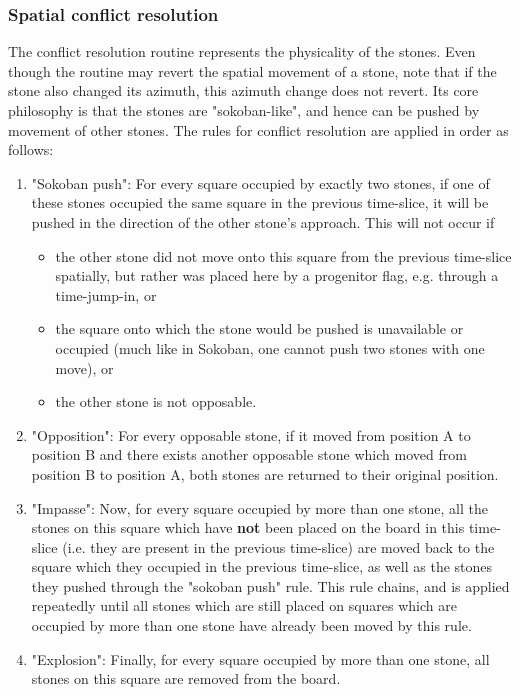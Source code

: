 \documentclass[12pt]{article}
\begin{document}
	\subsubsection{Spatial conflict resolution}\label{sec:spatial conflict resolution}
	The conflict resolution routine represents the physicality of the stones. Even though the routine may revert the spatial movement of a stone, note that if the stone also changed its azimuth, this azimuth change does not revert. Its core philosophy is that the stones are "sokoban-like", and hence can be pushed by movement of other stones. The rules for conflict resolution are applied in order as follows:
	\begin{enumerate}
		\item "Sokoban push": For every square occupied by exactly two stones, if one of these stones occupied the same square in the previous time-slice, it will be pushed in the direction of the other stone's approach. This will not occur if
		\begin{itemize}
			\item the other stone did not move onto this square from the previous time-slice spatially, but rather was placed here by a progenitor flag, e.g. through a time-jump-in, or
			\item the square onto which the stone would be pushed is unavailable or occupied (much like in Sokoban, one cannot push two stones with one move), or
			\item the other stone is not opposable.
		\end{itemize}
		\item "Opposition": For every opposable stone, if it moved from position A to position B and there exists another opposable stone which moved from position B to position A, both stones are returned to their original position.
		\item "Impasse": Now, for every square occupied by more than one stone, all the stones on this square which have \textbf{not} been placed on the board in this time-slice (i.e. they are present in the previous time-slice) are moved back to the square which they occupied in the previous time-slice, as well as the stones they pushed through the "sokoban push" rule. This rule chains, and is applied repeatedly until all stones which are still placed on squares which are occupied by more than one stone have already been moved by this rule.
		\item "Explosion": Finally, for every square occupied by more than one stone, all stones on this square are removed from the board.
	\end{enumerate}
\end{document}
